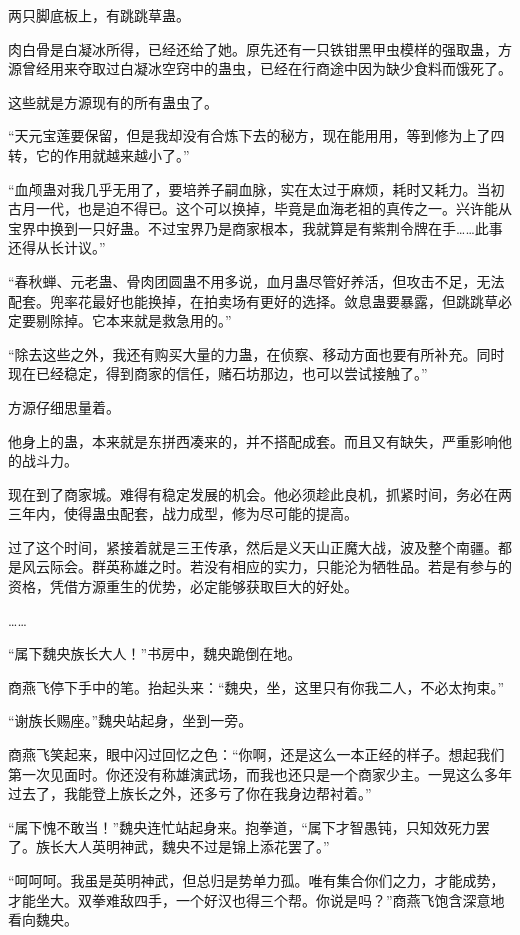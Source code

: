 \begin{this_body}
两只脚底板上，有跳跳草蛊。

肉白骨是白凝冰所得，已经还给了她。原先还有一只铁钳黑甲虫模样的强取蛊，方源曾经用来夺取过白凝冰空窍中的蛊虫，已经在行商途中因为缺少食料而饿死了。

这些就是方源现有的所有蛊虫了。

“天元宝莲要保留，但是我却没有合炼下去的秘方，现在能用用，等到修为上了四转，它的作用就越来越小了。”

“血颅蛊对我几乎无用了，要培养子嗣血脉，实在太过于麻烦，耗时又耗力。当初古月一代，也是迫不得已。这个可以换掉，毕竟是血海老祖的真传之一。兴许能从宝界中换到一只好蛊。不过宝界乃是商家根本，我就算是有紫荆令牌在手……此事还得从长计议。”

“春秋蝉、元老蛊、骨肉团圆蛊不用多说，血月蛊尽管好养活，但攻击不足，无法配套。兜率花最好也能换掉，在拍卖场有更好的选择。敛息蛊要暴露，但跳跳草必定要剔除掉。它本来就是救急用的。”

“除去这些之外，我还有购买大量的力蛊，在侦察、移动方面也要有所补充。同时现在已经稳定，得到商家的信任，赌石坊那边，也可以尝试接触了。”

方源仔细思量着。

他身上的蛊，本来就是东拼西凑来的，并不搭配成套。而且又有缺失，严重影响他的战斗力。

现在到了商家城。难得有稳定发展的机会。他必须趁此良机，抓紧时间，务必在两三年内，使得蛊虫配套，战力成型，修为尽可能的提高。

过了这个时间，紧接着就是三王传承，然后是义天山正魔大战，波及整个南疆。都是风云际会。群英称雄之时。若没有相应的实力，只能沦为牺牲品。若是有参与的资格，凭借方源重生的优势，必定能够获取巨大的好处。

……

“属下魏央族长大人！”书房中，魏央跪倒在地。

商燕飞停下手中的笔。抬起头来：“魏央，坐，这里只有你我二人，不必太拘束。”

“谢族长赐座。”魏央站起身，坐到一旁。

商燕飞笑起来，眼中闪过回忆之色：“你啊，还是这么一本正经的样子。想起我们第一次见面时。你还没有称雄演武场，而我也还只是一个商家少主。一晃这么多年过去了，我能登上族长之外，还多亏了你在我身边帮衬着。”

“属下愧不敢当！”魏央连忙站起身来。抱拳道，“属下才智愚钝，只知效死力罢了。族长大人英明神武，魏央不过是锦上添花罢了。”

“呵呵呵。我虽是英明神武，但总归是势单力孤。唯有集合你们之力，才能成势，才能坐大。双拳难敌四手，一个好汉也得三个帮。你说是吗？”商燕飞饱含深意地看向魏央。


\end{this_body}
